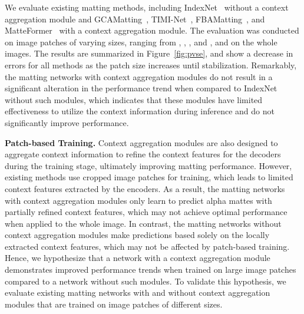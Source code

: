 \documentclass[10pt,twocolumn,letterpaper]{article}
\begin{document}
We evaluate existing matting methods, including IndexNet~\cite{lu2019indices} without a context aggregation module and GCAMatting~\cite{li2020natural}, TIMI-Net~\cite{Liu_2021_ICCV}, FBAMatting~\cite{forte2020fbamatting}, and MatteFormer~\cite{park2022matteformer} with a context aggregation module.
The evaluation was conducted on image patches of varying sizes, ranging from , , , and , and on the whole images. 
The results are summarized in Figure~\ref{fig:pvse}, and show a decrease in errors for all methods as the patch size increases until stabilization. 
Remarkably, the matting networks with context aggregation modules do not result in a significant alteration in the performance trend when compared to IndexNet without such modules, which indicates that these modules have limited effectiveness to utilize the context information during inference and do not significantly improve performance.


\noindent \textbf{Patch-based Training.}
Context aggregation modules are also designed to aggregate context information to refine the context features for the decoders during the training stage, ultimately improving matting performance. 
However, existing methods use cropped image patches for training, which leads to limited context features extracted by the encoders. 
As a result, the matting networks with context aggregation modules only learn to predict alpha mattes with partially refined context features, which may not achieve optimal performance when applied to the whole image.
In contrast, the matting networks without context aggregation modules make predictions based solely on the locally extracted context features, which may not be affected by patch-based training. 
Hence, we hypothesize that a network with a context aggregation module demonstrates improved performance trends when trained on large image patches compared to a network without such modules. 
To validate this hypothesis, we evaluate existing matting networks with and without context aggregation modules that are trained on image patches of different sizes. 
\end{document}
